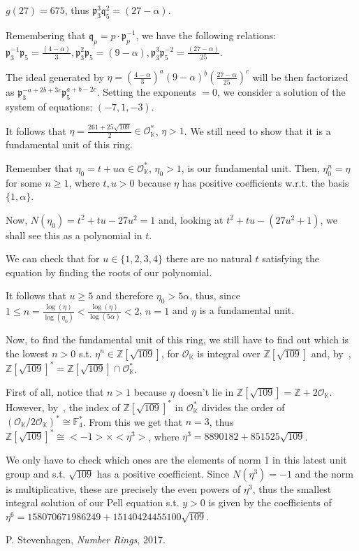 \documentclass{article}
\newcommand{\numberset}{\mathbb}
\newcommand{\Z}{\numberset{Z}}
\newcommand{\K}{\numberset{K}}
\newcommand{\F}{\numberset{F}}
\newcommand{\pid}{\mathfrak{p}}
\newcommand{\qid}{\mathfrak{q}}
\begin{document}
$g(27)=675$, thus $\pid_3^3\qid_5^2=(27-\alpha)$.

Remembering that $\qid_p=p\cdot\pid_p^{-1}$, we have the following relations: $\pid_3^{-1}\pid_5=\frac{(4-\alpha)}{3}, \pid_3^2\pid_5=(9-\alpha), \pid_3^3\pid_5^{-2}=\frac{(27-\alpha)}{25}$.

The ideal generated by $\eta=(\frac{4-\alpha}{3})^a(9-\alpha)^b(\frac{27-\alpha}{25})^c$ will be then factorized as $\pid_3^{-a+2b+3c}\pid_5^{a+b-2c}$. Setting the exponents $=0$, we consider a solution of the system of equations: $(-7,1,-3)$.

It follows that $\eta=\frac{261+25\sqrt{109}}{2}\in\mathcal{O}_{\K}^*$, $\eta>1$. We still need to show that it is a fundamental unit of this ring.

Remember that $\eta_0=t+u\alpha\in\mathcal{O}_{\K}^*$, $\eta_0>1$, is our fundamental unit. Then, $\eta_0^n=\eta$ for some $n\geq 1$, where $t,u>0$ because $\eta$ has positive coefficients w.r.t. the basis $\{1,\alpha\}$.

Now, $N(\eta_0)=t^2+tu-27u^2=1$ and, looking at $t^2+tu-(27u^2+1)$, we shall see this as a polynomial in $t$.

We can check that for $u\in\{1,2,3,4\}$ there are no natural $t$ satisfying the equation by finding the roots of our polynomial.

It follows that $u\geq 5$ and therefore $\eta_0>5\alpha$, thus, since $1\leq n=\frac{\log(\eta)}{\log(\eta_0)}<\frac{\log(\eta)}{\log(5\alpha)}<2$, $n=1$ and $\eta$ is a fundamental unit.

Now, to find the fundamental unit of this ring, we still have to find out which is the lowest $n>0$ s.t. $\eta^n\in\Z[\sqrt{109}]$, for $\mathcal{O}_{\K}$ is integral over $\Z[\sqrt{109}]$ and, by~\cite[ex. 5.20]{stev}, $\Z[\sqrt{109}]^*=\Z[\sqrt{109}]\cap\mathcal{O}_{\K}^*$.

First of all, notice that $n>1$ because $\eta$ doesn't lie in $\Z[\sqrt{109}]=\Z+2\mathcal{O}_{\K}$. However, by~\cite[5.16]{stev}, the index of $\Z[\sqrt{109}]^*$ in $\mathcal{O}_{\K}^*$ divides the order of $(\mathcal{O}_{\K}/2\mathcal{O}_{\K})^*\cong\F_4^*$. From this we get that $n=3$, thus $\Z[\sqrt{109}]^*\cong<-1>\times<\eta^3>$, where $\eta^3=8890182+851525\sqrt{109}$.

We only have to check which ones are the elements of norm 1 in this latest unit group and s.t. $\sqrt{109}$ has a positive coefficient. Since $N(\eta^3)=-1$ and the norm is multiplicative, these are precisely the even powers of $\eta^3$, thus the smallest integral solution of our Pell equation s.t. $y>0$ is given by the coefficients of $\eta^6=158070671986249+15140424455100\sqrt{109}$.


\begin{thebibliography}{9}
		P. Stevenhagen,
		\textit{Number Rings},
		2017.
\end{thebibliography}
\end{document}
